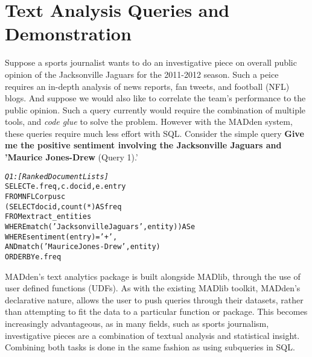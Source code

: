\section{Text Analysis Queries and Demonstration}
Suppose a sports journalist wants to do an investigative
piece on overall public opinion of the Jacksonville Jaguars
for the 2011-2012 season.
Such a peice requires an in-depth analysis of news reports, fan tweets, and 
football (NFL) blogs. And suppose we would also like to correlate the team's
performance to the public opinion. Such a query currently would require
the combination of multiple tools, and \textit{code glue} to solve the problem.
However with the MADden system, these queries require much less effort with SQL.
Consider the simple query \textbf{Give me the positive sentiment involving the
Jacksonville Jaguars and 'Maurice Jones-Drew} (Query 1).' 

\begin{small}
\begin{alltt}
\textit{Q1: [Ranked Document Lists]}
SELECT e.freq, c.docid,  e.entry
FROM NFLCorpus c
    (SELECT docid, count(*) AS freq
    FROM extract_entities
    WHERE match('Jacksonville Jaguars', entity)) AS e
WHERE sentiment(entry) = '+',
AND match('Maurice Jones-Drew', entity)
ORDER BY e.freq
\end{alltt}
\end{small}
\label{}

MADden's text analytics package is built alongside MADlib, through the use of
user defined functions (UDFs). As with the existing MADlib toolkit, MADden's 
declarative nature, allows the user to push queries through their datasets,
rather than attempting to fit the data to a particular function or package.
This becomes increasingly advantageous, as in many fields, such as sports
journalism, investigative pieces are a combination of textual analysis and
statistical insight. Combining both tasks is done in the same fashion as
using subqueries in SQL.

